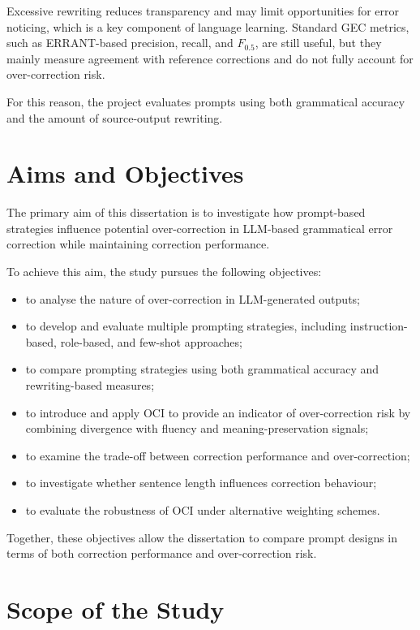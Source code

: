 Excessive rewriting reduces transparency and may limit opportunities for error noticing, which is a key component of language learning. Standard GEC metrics, such as ERRANT-based precision, recall, and $F_{0.5}$, are still useful, but they mainly measure agreement with reference corrections and do not fully account for over-correction risk.

For this reason, the project evaluates prompts using both grammatical accuracy and the amount of source-output rewriting.

\section{Aims and Objectives}

The primary aim of this dissertation is to investigate how prompt-based strategies influence potential over-correction in LLM-based grammatical error correction while maintaining correction performance.

To achieve this aim, the study pursues the following objectives:

\begin{itemize}
    \item to analyse the nature of over-correction in LLM-generated outputs;
    \item to develop and evaluate multiple prompting strategies, including instruction-based, role-based, and few-shot approaches;
    \item to compare prompting strategies using both grammatical accuracy and rewriting-based measures;
    \item to introduce and apply OCI to provide an indicator of over-correction risk by combining divergence with fluency and meaning-preservation signals;
    \item to examine the trade-off between correction performance and over-correction;
    \item to investigate whether sentence length influences correction behaviour;
    \item to evaluate the robustness of OCI under alternative weighting schemes.
\end{itemize}

Together, these objectives allow the dissertation to compare prompt designs in terms of both correction performance and over-correction risk.

\section{Scope of the Study}

